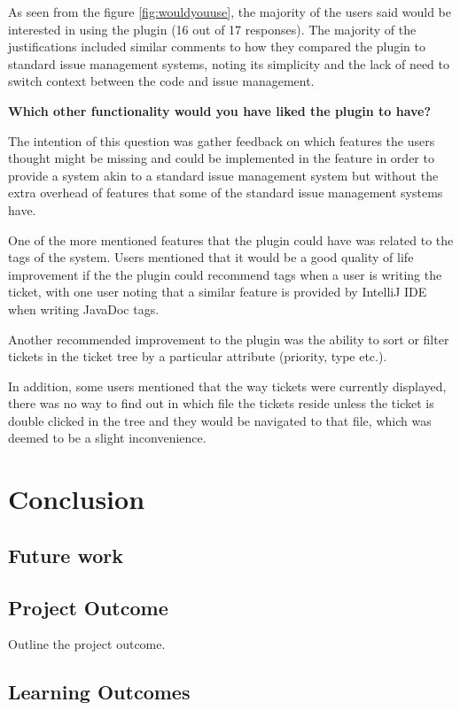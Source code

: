 \documentclass{4thYearProject}
\begin{document}
As seen from the figure \ref{fig:wouldyouuse}, the majority of the users said would be interested in using the plugin (16 out of 17 responses). The majority of the justifications included similar comments to how they compared the plugin to standard issue management systems, noting its simplicity and the lack of need to switch context between the code and issue management. 

\textbf{Which other functionality would you have liked the plugin to have?}

The intention of this question was gather feedback on which features the users thought might be missing and could be implemented in the feature in order to provide a system akin to a standard issue management system but without the extra overhead of features that some of the standard issue management systems have.

One of the more mentioned features that the plugin could have was related to the tags of the system. Users mentioned that it would be a good quality of life improvement if the the plugin could recommend tags when a user is writing the ticket, with one user noting that a similar feature is provided by IntelliJ IDE when writing JavaDoc tags.

Another recommended improvement to the plugin was the ability to sort or filter tickets in the ticket tree by a particular attribute (priority, type etc.). 

In addition, some users mentioned that the way tickets were currently displayed, there was no way to find out in which file the tickets reside unless the ticket is double clicked in the tree and they would be navigated to that file, which was deemed to be a slight inconvenience. 

\chapter{Conclusion}

\section{Future work}

\section{Project Outcome}

Outline the project outcome. 

\section{Learning Outcomes}







\begin{appendices}
\end{appendices}
\end{document}
